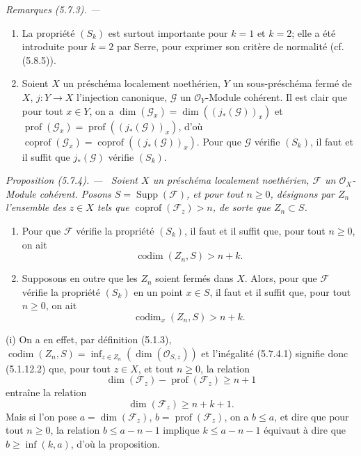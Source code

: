 \documentclass[10pt,oneside]{book}
\newenvironment{proposition}[1][]{%
  \par\medskip\noindent\itshape Proposition (#1). ---\ }{\par}
\newenvironment{remarks}[1][]{%
  \par\medskip\noindent\itshape Remarques (#1). ---\ }{\par}
\begin{document}
\begin{remarks}[5.7.3]
\begin{enumerate}
\item[(v)] La propriété $(S_k)$ est surtout importante pour $k=1$ et
$k=2$; elle a été introduite pour $k=2$ par Serre, pour exprimer son critère
de normalité (cf. (5.8.5)).

\item[(vi)] Soient $X$ un préschéma localement noethérien, $Y$ un
sous-préschéma fermé de $X$, $j:Y\to X$ l'injection canonique, $\mathscr G$
un $\mathcal O_Y$-Module cohérent. Il est clair que pour tout $x\in Y$, on a
$\dim(\mathscr G_x)=\dim((j_*(\mathscr G))_x)$ et
$\operatorname{prof}(\mathscr G_x)=\operatorname{prof}((j_*(\mathscr G))_x)$,
d'où
$\operatorname{coprof}(\mathscr G_x)=\operatorname{coprof}((j_*(\mathscr G))_x)$.
Pour que $\mathscr G$ vérifie $(S_k)$, il faut et il suffit que
$j_*(\mathscr G)$ vérifie $(S_k)$.
\end{enumerate}
\end{remarks}

\begin{proposition}[5.7.4]
\label{IV.2.s5.7.4-fr}
Soient $X$ un préschéma localement noethérien, $\mathscr F$ un
$\mathcal O_X$-Module cohérent. Posons $S=\operatorname{Supp}(\mathscr F)$,
et pour tout $n\geq0$, désignons par $Z_n$ l'ensemble des $z\in X$ tels que
$\operatorname{coprof}(\mathscr F_z)>n$, de sorte que $Z_n\subset S$.
\begin{enumerate}
\item[(i)] Pour que $\mathscr F$ vérifie la propriété $(S_k)$, il faut et il
suffit que, pour tout $n\geq0$, on ait
\begin{equation}
\operatorname{codim}(Z_n,S)>n+k.
\tag{5.7.4.1}\label{IV.2.s5.7.4.1-fr}
\end{equation}
\item[(ii)] Supposons en outre que les $Z_n$ soient fermés dans $X$. Alors,
pour que $\mathscr F$ vérifie la propriété $(S_k)$ en un point $x\in S$, il
faut et il suffit que, pour tout $n\geq0$, on ait
\begin{equation}
\operatorname{codim}_x(Z_n,S)>n+k.
\tag{5.7.4.2}\label{IV.2.s5.7.4.2-fr}
\end{equation}
\end{enumerate}
\end{proposition}

(i) On a en effet, par définition (5.1.3),
$\operatorname{codim}(Z_n,S)=\inf_{z\in Z_n}(\dim(\mathcal O_{S,z}))$ et
l'inégalité (5.7.4.1) signifie donc (5.1.12.2) que, pour tout $z\in X$, et
tout $n\geq0$, la relation
\[
\dim(\mathscr F_z)-\operatorname{prof}(\mathscr F_z)\geq n+1
\]
entraîne la relation
\[
\dim(\mathscr F_z)\geq n+k+1.
\]
Mais si l'on pose $a=\dim(\mathscr F_z)$,
$b=\operatorname{prof}(\mathscr F_z)$, on a $b\leq a$, et dire que pour tout
$n\geq0$, la relation $b\leq a-n-1$ implique $k\leq a-n-1$ équivaut à dire
que $b\geq\inf(k,a)$, d'où la proposition.
\end{document}
